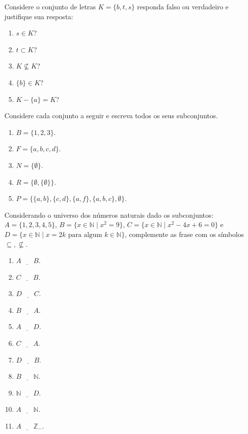 \begin{problemset}
\begin{enumerate}
	\end{enumerate}
	\item Considere o conjunto de letras $K = \{b, t, s\}$ responda falso ou verdadeiro e justifique sua resposta:
	\begin{enumerate}
		\item $s \in K$?
		\item $t \subset K$?
		\item $K \not\subseteq K$?
		\item $\{b\} \in K$?
		\item $K - \{a\} = K$?
	\end{enumerate}
	\item Considere cada conjunto a seguir e escreva todos os seus subconjuntos.
	\begin{enumerate}
		\item $B = \{1, 2, 3\}$.
		\item $F = \{a, b, c, d\}$.
		\item $N = \{\emptyset\}$.
		\item $R = \{\emptyset, \{\emptyset\}\}$.
		\item $P = \{\{a, b\}, \{c, d\}, \{a, f\}, \{a, b, c\}, \emptyset\}$.
	\end{enumerate}
	\item Considerando o universo dos números naturais dado os subconjuntos:  $A = \{1, 2, 3, 4, 5\}$, $B = \{x \in \mathbb{N} \mid x^2 = 9\}$, $C = \{x \in \mathbb{N} \mid x^2 - 4x + 6 = 0\}$ e $D = \{x \in \mathbb{N} \mid  x = 2k \mbox{ para algum } k \in \mathbb{N}\}$, complemente as frase com os símbolos $\subseteq, \not\subseteq$.
	\begin{enumerate}
		\item $A \ \underline{ \ \ \ \ \ \ } \ B$.
		\item $C \ \underline{ \ \ \ \ \ \ } \ B$.
		\item $D \ \underline{ \ \ \ \ \ \ } \ C$.
		\item $B \ \underline{ \ \ \ \ \ \ } \ A$.
		\item $A \ \underline{ \ \ \ \ \ \ } \ D$.
		\item $C \ \underline{ \ \ \ \ \ \ } \ A$.
		\item $D \ \underline{ \ \ \ \ \ \ } \ B$.
		\item $B \ \underline{ \ \ \ \ \ \ } \ \mathbb{N}$.
		\item $\mathbb{N} \ \underline{ \ \ \ \ \ \ } \ D$.
		\item $A \ \underline{ \ \ \ \ \ \ } \ \mathbb{N}$.
		\item $A \ \underline{ \ \ \ \ \ \ } \ \mathbb{Z}_-$.

\end{enumerate}
\end{problemset}
